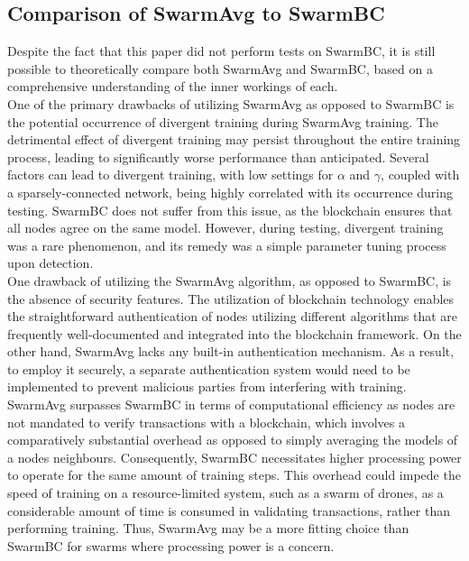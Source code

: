 \subsection{Comparison of SwarmAvg to SwarmBC}
Despite the fact that this paper did not perform tests on SwarmBC, it is still possible to theoretically compare both SwarmAvg and SwarmBC, based on a comprehensive understanding of the inner workings of each. \\

One of the primary drawbacks of utilizing SwarmAvg as opposed to SwarmBC is the potential occurrence of divergent training during SwarmAvg training. The detrimental effect of divergent training may persist throughout the entire training process, leading to significantly worse performance than anticipated. Several factors can lead to divergent training, with low settings for $\alpha$ and $\gamma$, coupled with a sparsely-connected network, being highly correlated with its occurrence during testing. SwarmBC does not suffer from this issue, as the blockchain ensures that all nodes agree on the same model. However, during testing, divergent training was a rare phenomenon, and its remedy was a simple parameter tuning process upon detection. \\

One drawback of utilizing the SwarmAvg algorithm, as opposed to SwarmBC, is the absence of security features. The utilization of blockchain technology enables the straightforward authentication of nodes utilizing different algorithms that are frequently well-documented and integrated into the blockchain framework. On the other hand, SwarmAvg lacks any built-in authentication mechanism. As a result, to employ it securely, a separate authentication system would need to be implemented to prevent malicious parties from interfering with training. \\

SwarmAvg surpasses SwarmBC in terms of computational efficiency as nodes are not mandated to verify transactions with a blockchain, which involves a comparatively substantial overhead as opposed to simply averaging the models of a nodes neighbours. Consequently, SwarmBC necessitates higher processing power to operate for the same amount of training steps. This overhead could impede the speed of training on a resource-limited system, such as a swarm of drones, as a considerable amount of time is consumed in validating transactions, rather than performing training. Thus, SwarmAvg may be a more fitting choice than SwarmBC for swarms where processing power is a concern.


